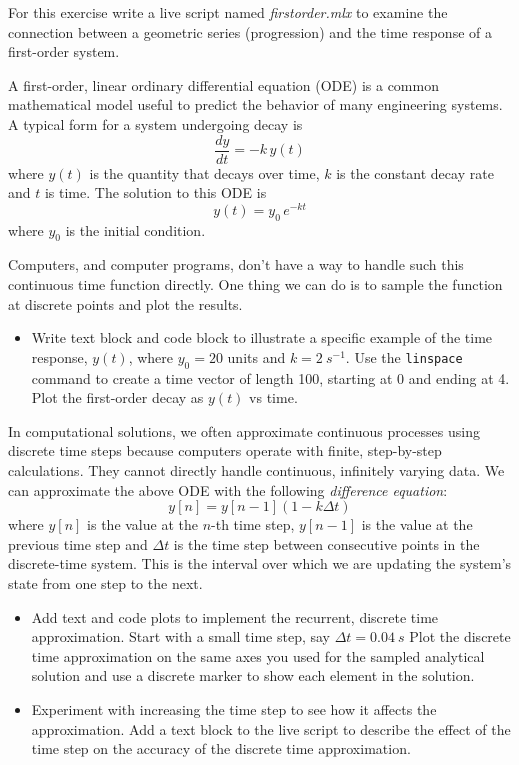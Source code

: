 \begin{ex}

For this exercise write a live script named \emph{firstorder.mlx} to examine the connection between a geometric series (progression) and the time response of a first-order system.

A first-order, linear ordinary differential equation (ODE) is a common mathematical model useful to predict the behavior of many engineering systems.  A typical form for a system undergoing decay is
\begin{equation*}
     \frac{dy}{dt} = -k \, y(t)
\end{equation*}
where $y(t)$ is the quantity that decays over time, $k$ is the constant decay rate and $t$ is time.  The solution to this ODE is
\begin{equation*}
     y(t) = y_0 \, e^{-kt}
\end{equation*}
where $y_0$ is the initial condition.

Computers, and computer programs, don't have a way to handle such this continuous time function directly.  One thing we can do is to sample the function at discrete points and plot the results.

\begin{itemize}
     \item Write text block and code block to illustrate a specific example of the time response, $y(t)$, where $y_0 = 20$ units and $k=\SI{2}{s^{-1}}$.  Use the \lstinline{linspace} command to create a time vector of length 100, starting at 0 and ending at 4. Plot the first-order decay as $y(t)$ vs time.
\end{itemize}

In computational solutions, we often approximate continuous processes using discrete time steps because computers operate with finite, step-by-step calculations. They cannot directly handle continuous, infinitely varying data.  We can approximate the above ODE with the following \emph{difference equation}:
\begin{equation*}
     y[n] = y[n-1] (1- k \Delta t)
\end{equation*}
where $y[n]$ is the value at the $n$-th time step, $y[n-1]$ is the value at the previous time step and $\Delta t$ is the time step between consecutive points in the discrete-time system. This is the interval over which we are updating the system's state from one step to the next.

\begin{itemize}
     \item Add text and code plots to implement the recurrent, discrete time approximation.  Start with a small time step, say $\Delta t = \SI{0.04}{s}$ Plot the discrete time approximation on the same axes you used for the sampled analytical solution and use a discrete marker to show each element in the solution.
     \item Experiment with increasing the time step to see how it affects the approximation.  Add a text block to the live script to describe the effect of the time step on the accuracy of the discrete time approximation.
\end{itemize}

\end{ex}